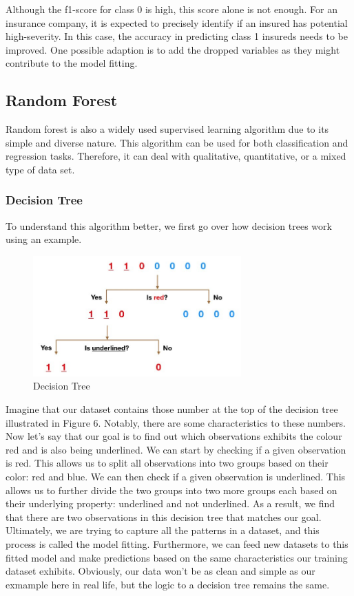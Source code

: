 \documentclass[12pt]{article} %
\theoremstyle{definition}
\begin{document}
\vspace{\baselineskip}
Although the f1-score for class 0 is high, this score alone is not enough. For an insurance company, it is expected to precisely identify if an insured has potential high-severity. In this case, the accuracy in predicting class 1 insureds needs to be improved. One possible adaption is to add the dropped variables as they might contribute to the model fitting.

\newpage
\subsection{Random Forest}
Random forest is also a widely used supervised learning algorithm due to its simple and diverse nature. This algorithm can be used for both classification and regression tasks. Therefore, it can deal with qualitative, quantitative, or a mixed type of data set.

\subsubsection{Decision Tree}
To understand this algorithm better, we first go over how decision trees work using an example.\cite{RandomForest}

\begin{figure}[H]
    \centering
    \includegraphics[width=8cm]{RandomForest/decisionTree.png}
    \caption{Decision Tree}
    \label{fig:my_label}
\end{figure}

Imagine that our dataset contains those number at the top of the decision tree illustrated in Figure 6. Notably, there are some characteristics to these numbers. Now let’s say that our goal is to find out which observations exhibits the colour red and is also being underlined. We can start by checking if a given observation is red. This allows us to split all observations into two groups based on their color: red and blue. We can then check if a given observation is underlined. This allows us to further divide the two groups into two more groups each based on their underlying property: underlined and not underlined. As a result, we find that there are two observations in this decision tree that matches our goal. Ultimately, we are trying to capture all the patterns in a dataset, and this process is called the model fitting. Furthermore, we can feed new datasets to this fitted model and make predictions based on the same characteristics our training dataset exhibits. Obviously, our data won’t be as clean and simple as our exmample here in real life, but the logic to a decision tree remains the same. 
\end{document}
